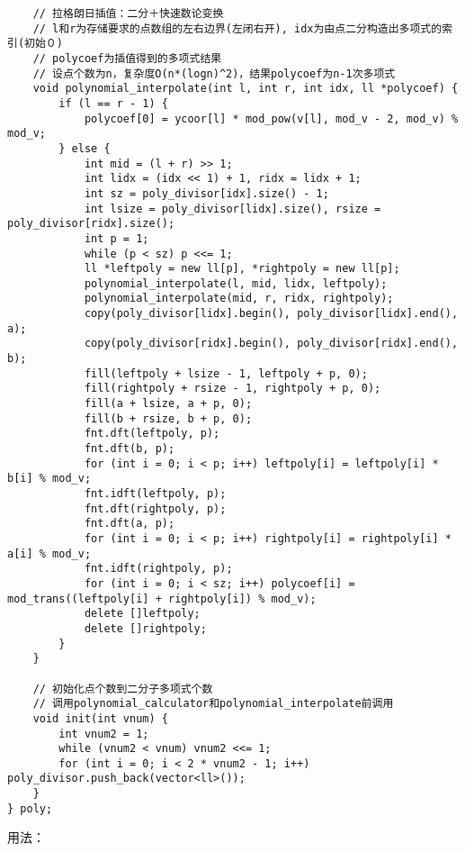 \begin{verbatim}
    // 拉格朗日插值：二分＋快速数论变换
    // l和r为存储要求的点数组的左右边界(左闭右开), idx为由点二分构造出多项式的索引(初始０)
    // polycoef为插值得到的多项式结果
    // 设点个数为n，复杂度O(n*(logn)^2)，结果polycoef为n-1次多项式
    void polynomial_interpolate(int l, int r, int idx, ll *polycoef) {
        if (l == r - 1) {
            polycoef[0] = ycoor[l] * mod_pow(v[l], mod_v - 2, mod_v) % mod_v;
        } else {
            int mid = (l + r) >> 1;
            int lidx = (idx << 1) + 1, ridx = lidx + 1;
            int sz = poly_divisor[idx].size() - 1;
            int lsize = poly_divisor[lidx].size(), rsize = poly_divisor[ridx].size();
            int p = 1;
            while (p < sz) p <<= 1;
            ll *leftpoly = new ll[p], *rightpoly = new ll[p];
            polynomial_interpolate(l, mid, lidx, leftpoly);
            polynomial_interpolate(mid, r, ridx, rightpoly);
            copy(poly_divisor[lidx].begin(), poly_divisor[lidx].end(), a);
            copy(poly_divisor[ridx].begin(), poly_divisor[ridx].end(), b);
            fill(leftpoly + lsize - 1, leftpoly + p, 0);
            fill(rightpoly + rsize - 1, rightpoly + p, 0);
            fill(a + lsize, a + p, 0);
            fill(b + rsize, b + p, 0);
            fnt.dft(leftpoly, p);
            fnt.dft(b, p);
            for (int i = 0; i < p; i++) leftpoly[i] = leftpoly[i] * b[i] % mod_v;
            fnt.idft(leftpoly, p);
            fnt.dft(rightpoly, p);
            fnt.dft(a, p);
            for (int i = 0; i < p; i++) rightpoly[i] = rightpoly[i] * a[i] % mod_v;
            fnt.idft(rightpoly, p);
            for (int i = 0; i < sz; i++) polycoef[i] = mod_trans((leftpoly[i] + rightpoly[i]) % mod_v); 
            delete []leftpoly;
            delete []rightpoly; 
        }
    }
    
    // 初始化点个数到二分子多项式个数
    // 调用polynomial_calculator和polynomial_interpolate前调用
    void init(int vnum) {
        int vnum2 = 1;
        while (vnum2 < vnum) vnum2 <<= 1;
        for (int i = 0; i < 2 * vnum2 - 1; i++)  poly_divisor.push_back(vector<ll>());
    }
} poly;
\end{verbatim}

用法：

